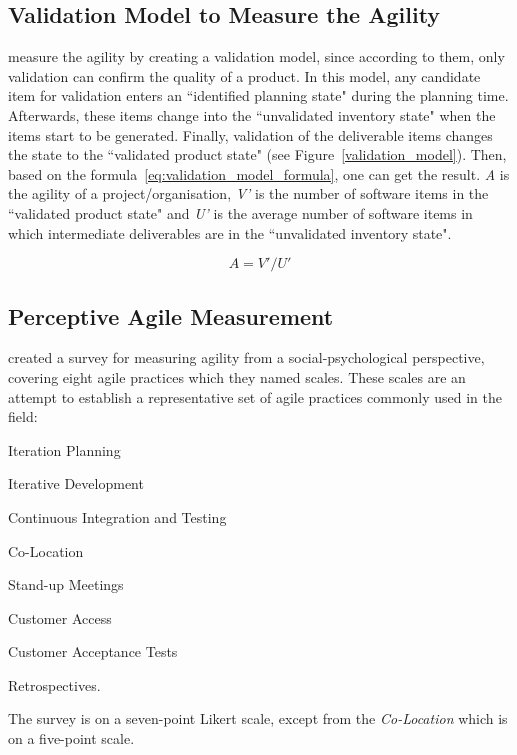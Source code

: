 \subsection{Validation Model to Measure the Agility}
\citet{validation_model} measure the agility by creating a validation model, since according to them, only validation can confirm the quality of a product. In this model, any candidate item for validation enters an ``identified planning state" during the planning time. Afterwards, these items change into the ``unvalidated inventory state" when the items start to be generated. Finally, validation of the deliverable items changes the state to the ``validated product state" (see Figure~\ref{validation_model}). Then, based on the formula~\eqref{eq:validation_model_formula}, one can get the result. \textit{A} is the agility of a project/organisation, \textit{V'} is the number of software items in the ``validated product state" and \textit{U'} is the average number of software items in which intermediate deliverables are in the ``unvalidated inventory state".

\begin{equation} \label{eq:validation_model_formula}  A = V'/U' \end{equation}

\subsection{Perceptive Agile Measurement}
\citet{pam} created a survey for measuring agility from a social-psychological perspective, covering eight agile practices which they named scales. These scales are an attempt to establish a representative set of agile practices commonly used in the field:

\begin{inparaenum} [a\upshape)]
\item Iteration Planning
\item Iterative Development
\item Continuous Integration and Testing
\item Co-Location
\item Stand-up Meetings
\item Customer Access
\item Customer Acceptance Tests
\item Retrospectives.
\end{inparaenum} The survey is on a seven-point Likert scale, except from the \textit{Co-Location} which is on a five-point scale.

